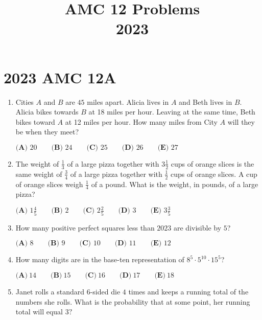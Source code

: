\documentclass{article}
\title{AMC 12 Problems \\ 2023}
\date{}
\begin{document}
\maketitle\thispagestyle{fancy}\newpage\section*{2023 AMC 12A}\begin{enumerate}[label=\arabic*., itemsep=0.5em]\item Cities \(A\) and \(B\) are \(45\) miles apart. Alicia lives in \(A\) and Beth lives in \(B\). Alicia bikes towards \(B\) at 18 miles per hour. Leaving at the same time, Beth bikes toward \(A\) at 12 miles per hour. How many miles from City \(A\) will they be when they meet?

\(\textbf{(A) }20\qquad\textbf{(B) }24\qquad\textbf{(C) }25\qquad\textbf{(D) }26\qquad\textbf{(E) }27\)\par \vspace{0.5em}\item The weight of \(\frac{1}{3}\) of a large pizza together with \(3 \frac{1}{2}\) cups of orange slices is the same weight of \(\frac{3}{4}\) of a large pizza together with \(\frac{1}{2}\) cups of orange slices. A cup of orange slices weigh \(\frac{1}{4}\) of a pound. What is the weight, in pounds, of a large pizza?

\(\textbf{(A) }1\frac{4}{5}\qquad\textbf{(B) }2\qquad\textbf{(C) }2\frac{2}{5}\qquad\textbf{(D) }3\qquad\textbf{(E) }3\frac{3}{5}\)\par \vspace{0.5em}\item How many positive perfect squares less than \(2023\) are divisible by \(5\)?

\(\textbf{(A) }8\qquad\textbf{(B) }9\qquad\textbf{(C) }10\qquad\textbf{(D) }11\qquad\textbf{(E) }12\)\par \vspace{0.5em}\item How many digits are in the base-ten representation of \(8^5 \cdot 5^{10} \cdot 15^5\)?

\(\textbf{(A)}~14\qquad\textbf{(B)}~15\qquad\textbf{(C)}~16\qquad\textbf{(D)}~17\qquad\textbf{(E)}~18\qquad\)\par \vspace{0.5em}\item Janet rolls a standard \(6\)-sided die \(4\) times and keeps a running total of the numbers she rolls. What is the probability that at some point, her running total will equal \(3?\)


\end{enumerate}
\end{document}
